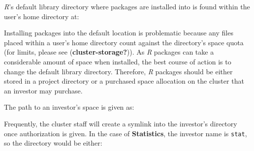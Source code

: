 \documentclass[
  letterpaper,
  DIV=11,
  numbers=noendperiod]{scrreport}
\newenvironment{Shaded}{\begin{snugshade}}{\end{snugshade}}
\newcommand{\CommentTok}[1]{\textcolor[rgb]{0.37,0.37,0.37}{#1}}
\newcommand{\ExtensionTok}[1]{\textcolor[rgb]{0.00,0.23,0.31}{#1}}
\newcommand{\NormalTok}[1]{\textcolor[rgb]{0.00,0.23,0.31}{#1}}
\newcommand{\OperatorTok}[1]{\textcolor[rgb]{0.37,0.37,0.37}{#1}}
\newcommand{\VariableTok}[1]{\textcolor[rgb]{0.07,0.07,0.07}{#1}}
\begin{document}
\emph{R}'s default library directory where packages are installed into
is found within the user's home directory at:

\begin{Shaded}
\end{Shaded}

Installing packages into the default location is problematic because any
files placed within a user's home directory count against the
directory's space quota (for limits, please see
(\textbf{cluster-storage?})). As \emph{R} packages can take a
considerable amount of space when installed, the best course of action
is to change the default library directory. Therefore, \emph{R} packages
should be either stored in a project directory or a purchased space
allocation on the cluster that an investor may purchase.

The path to an investor's space is given as:

\begin{Shaded}
\end{Shaded}

Frequently, the cluster staff will create a symlink into the investor's
directory once authorization is given. In the case of
\textbf{Statistics}, the investor name is \texttt{stat}, so the
directory would be either:

\begin{Shaded}
\end{Shaded}
\end{document}
